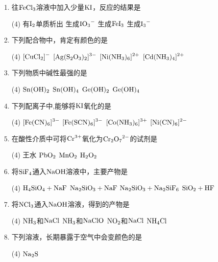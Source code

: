 \begin{enumerate}[label=\arabic*., itemsep=1.5ex]
    \item 往$\ce{FeCl3}$溶液中加入少量$\ce{KI}$，反应的结果是
    \begin{tasks}(4)
        \task 有$\ce{I2}$单质析出
        \task 生成$\ce{IO3^-}$
        \task 生成$\ce{FeI3}$
        \task 生成$\ce{I3^-}$
    \end{tasks}
    \item 下列配合物中，肯定有颜色的是
    \begin{tasks}(4)
        \task $\ce{[CuCl2]^-}$
        \task $\ce{[Ag(S2O3)2]^3-}$
        \task $\ce{[Ni(NH3)6]^2+}$
        \task $\ce{[Cd(NH3)4]^2+}$
    \end{tasks}
    \item 下列物质中碱性最强的是
    \begin{tasks}(4)
        \task $\ce{Sn(OH)2}$
        \task $\ce{Sn(OH)4}$
        \task $\ce{Ge(OH)2}$
        \task $\ce{Ge(OH)4}$
    \end{tasks}
    \item 下列配离子中,能够将$\ce{KI}$氧化的是
    \begin{tasks}(4)
        \task $\ce{[Fe(CN)6]^3-}$
        \task $\ce{[Fe(SCN)6]^3-}$
        \task $\ce{[Co(NH3)6]^3+}$
        \task $\ce{[Ni(CN)6]^2-}$
    \end{tasks}
    \item 在酸性介质中可将$\ce{Cr^3+}$氧化为$\ce{Cr2O7^2-}$的试剂是
    \begin{tasks}(4)
        \task 王水
        \task $\ce{PbO2}$
        \task $\ce{MnO2}$
        \task $\ce{H2O2}$
    \end{tasks}
    \item 将$\ce{SiF4}$通入$\ce{NaOH}$溶液中，主要产物是
    \begin{tasks}(4)
        \task $\ce{H4SiO4 + NaF}$
        \task $\ce{Na2SiO3 + NaF}$
        \task $\ce{Na2SiO3 + Na2SiF6}$
        \task $\ce{SiO2 + HF}$
    \end{tasks}
    \item 将$\ce{NCl3}$通入$\ce{NaOH}$溶液，得到的产物是
    \begin{tasks}(4)
        \task $\ce{NH3}$和$\ce{NaCl}$
        \task $\ce{NH3}$和$\ce{NaClO}$
        \task $\ce{NO2}$和$\ce{NaCl}$
        \task $\ce{NH4Cl}$
    \end{tasks}
    \item 下列溶液，长期暴露于空气中会变颜色的是
    \begin{tasks}(4)
        \task $\ce{Na2S}$

\end{tasks}
\end{enumerate}

